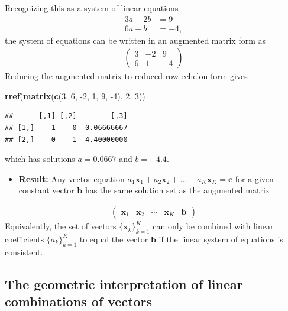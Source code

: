 \documentclass[
]{book}
\newenvironment{Shaded}{\begin{snugshade}}{\end{snugshade}}
\newcommand{\DecValTok}[1]{\textcolor[rgb]{0.00,0.00,0.81}{#1}}
\newcommand{\KeywordTok}[1]{\textcolor[rgb]{0.13,0.29,0.53}{\textbf{#1}}}
\newcommand{\NormalTok}[1]{#1}
\providecommand{\tightlist}{%
  \setlength{\itemsep}{0pt}\setlength{\parskip}{0pt}}
\theoremstyle{definition}
\theoremstyle{definition}
\theoremstyle{definition}
\theoremstyle{remark}
\begin{document}
Recognizing this as a system of linear equations
\[
\begin{aligned}
3a - 2b & = 9 \\ 
6a + b & = -4,
\end{aligned}
\]
the system of equations can be written in an augmented matrix form as
\[
\begin{aligned}
\begin{pmatrix}
3  & - 2 & 9\\
6  &   1 & -4 
\end{pmatrix}
\end{aligned}
\]
Reducing the augmented matrix to reduced row echelon form gives

\begin{Shaded}
\begin{Highlighting}[]
\KeywordTok{rref}\NormalTok{(}\KeywordTok{matrix}\NormalTok{(}\KeywordTok{c}\NormalTok{(}\DecValTok{3}\NormalTok{, }\DecValTok{6}\NormalTok{, }\DecValTok{-2}\NormalTok{, }\DecValTok{1}\NormalTok{, }\DecValTok{9}\NormalTok{, }\DecValTok{-4}\NormalTok{), }\DecValTok{2}\NormalTok{, }\DecValTok{3}\NormalTok{))}
\end{Highlighting}
\end{Shaded}

\begin{verbatim}
##      [,1] [,2]        [,3]
## [1,]    1    0  0.06666667
## [2,]    0    1 -4.40000000
\end{verbatim}

which has solutions \(a = 0.0667\) and \(b = -4.4\).

\begin{itemize}
\tightlist
\item
  \textbf{Result:} Any vector equation \(a_1 \mathbf{x}_1 + a_2 \mathbf{x}_2 + \ldots + a_K \mathbf{x}_K = \mathbf{c}\) for a given constant vector \(\mathbf{b}\) has the same solution set as the augmented matrix
\end{itemize}

\[
\begin{aligned}
\begin{pmatrix} \mathbf{x}_1 & \mathbf{x}_2 & \cdots & \mathbf{x}_K & \mathbf{b} \end{pmatrix}
\end{aligned}
\]
Equivalently, the set of vectors \(\{\mathbf{x}_k\}_{k=1}^K\) can only be combined with linear coefficients \(\{a_k\}_{k=1}^K\) to equal the vector \(\mathbf{b}\) if the linear system of equations is consistent.

\hypertarget{the-geometric-interpretation-of-linear-combinations-of-vectors}{%
\subsection{The geometric interpretation of linear combinations of vectors}\label{the-geometric-interpretation-of-linear-combinations-of-vectors}}
\end{document}
